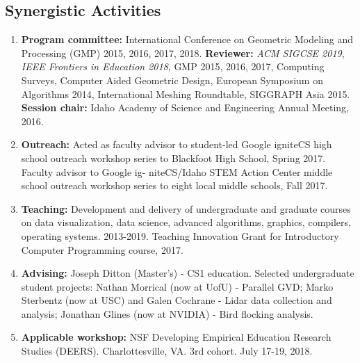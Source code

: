 \documentclass[svgnames,12pt]{article}
\newenvironment{tightenumerate}{
\begin{enumerate}
  \setlength{\itemsep}{1pt}
  \setlength{\parskip}{0pt}
  \setlength{\parsep}{0pt}
}{\end{enumerate}
}
\begin{document}
\subsection*{Synergistic Activities}
\begin{tightenumerate}
\item \textbf{Program committee:} International Conference on Geometric Modeling and Processing (GMP) 2015, 2016, 2017, 2018. \textbf{Reviewer:} \textit{ACM SIGCSE 2019}, \textit{IEEE Frontiers in Education 2018}, GMP 2015, 2016, 2017, Computing Surveys, Computer Aided Geometric Design, European Symposium on Algorithms 2014, International Meshing Roundtable, SIGGRAPH Asia 2015. \textbf{Session chair:} Idaho Academy of Science and Engineering Annual Meeting, 2016.
\item \textbf{Outreach:} Acted as faculty advisor to student-led Google igniteCS high school outreach workshop series to Blackfoot High School, Spring 2017. Faculty advisor to Google ig- niteCS/Idaho STEM Action Center middle school outreach workshop series to eight local middle schools, Fall 2017.
\item \textbf{Teaching:} Development and delivery of undergraduate and graduate courses on data visualization, data science, advanced algorithms, graphics, compilers, operating systems. 2013-2019. Teaching Innovation Grant for Introductory Computer Programming course, 2017.
\item \textbf{Advising:} Joseph Ditton (Master's) - CS1 education. Selected undergraduate student projects: Nathan Morrical (now at UofU) - Parallel GVD; Marko Sterbentz (now at USC) and Galen Cochrane - Lidar data collection and analysis; Jonathan Glines (now at NVIDIA) - Bird flocking analysis.
\item \textbf{Applicable workshop:} NSF Developing Empirical Education Research Studies (DEERS). Charlottesville, VA. 3rd cohort. July 17-19, 2018.
\end{tightenumerate}
\end{document}
